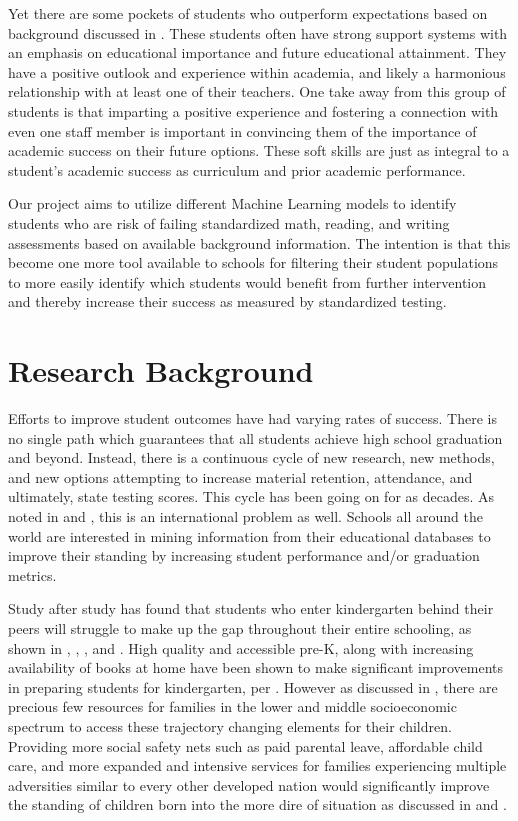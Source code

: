 \documentclass[man,floatsintext]{apa6} %
\begin{document}
Yet there are some pockets of students who outperform expectations based on background discussed in \cite{YanGaiLowSEG}. These students often have strong support systems with an emphasis on educational importance and future educational attainment. They have a positive outlook and experience within academia, and likely a harmonious relationship with at least one of their teachers. One take away from this group of students is that imparting a positive experience and fostering a connection with even one staff member is important in convincing them of the importance of academic success on their future options. These soft skills are just as integral to a student's academic success as curriculum and prior academic performance.

Our project aims to utilize different Machine Learning models to identify students who are risk of failing standardized math, reading, and writing assessments based on available background information.  The intention is that this become one more tool available to schools for filtering their student populations to more easily identify which students would benefit from further intervention and thereby increase their success as measured by standardized testing.

\section{Research Background}
Efforts to improve student outcomes have had varying rates of success. There is no single path which guarantees that all students achieve high school graduation and beyond.  Instead, there is a continuous cycle of new research, new methods, and new options attempting to increase material retention, attendance, and ultimately, state testing scores. This cycle has been going on for as decades. As noted in \cite{AustraliaSES} and \cite{Malaysia}, this is an international problem as well. Schools all around the world are interested in mining information from their educational databases to improve their standing by increasing student performance and/or graduation metrics.  

Study after study has found that students who enter kindergarten behind their peers will struggle to make up the gap throughout their entire schooling, as shown in \cite{EdInequities}, \cite{sesbehind1}, \cite{sesbehind2}, and \cite{sesbehind3}. High quality and accessible pre-K, along with increasing availability of books at home have been shown to make significant improvements in preparing students for kindergarten, per \cite{earlyengageML}. However as discussed in \cite{cradleK}, there are precious few resources for families in the lower and middle socioeconomic spectrum to access these trajectory changing elements for their children. Providing more social safety nets such as paid parental leave, affordable child care, and more expanded and intensive services for families experiencing multiple adversities similar to every other developed nation would significantly improve the standing of children born into the more dire of situation as discussed in \cite{duncan2013long} and \cite{duncan2012importance}.
\end{document}
